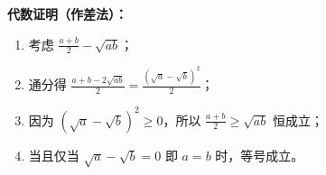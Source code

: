 \begin{proofbox}
\textbf{代数证明（作差法）：}
\begin{enumerate}
    \item 考虑 $\frac{a+b}{2} - \sqrt{ab}$；
    \item 通分得 $\frac{a+b-2\sqrt{ab}}{2} = \frac{(\sqrt{a}-\sqrt{b})^2}{2}$；
    \item 因为 $(\sqrt{a}-\sqrt{b})^2 \geqslant 0$，所以 $\frac{a+b}{2} \geqslant \sqrt{ab}$ 恒成立；
    \item 当且仅当 $\sqrt{a}-\sqrt{b}=0$ 即 $a=b$ 时，等号成立。
\end{enumerate}
\end{proofbox}